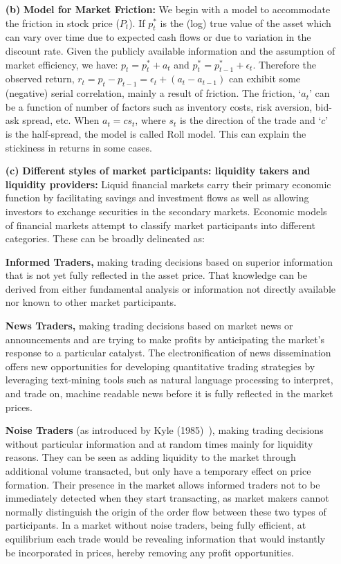 \begin{enumerate}
\item[\textbf{(b)}] {\bfseries Model for Market Friction:} We begin with a model to accommodate the friction in stock price ($P_t$). If $p_t^*$ is the (log) true value of the asset which can vary over time due to expected cash flows or due to variation in the discount rate. Given the publicly available information and the assumption of market efficiency, we have: $p_t= p_t^* + a_t$ and $p_t^*= p_{t-1}^* + \epsilon_t$. Therefore the observed return, $r_t= p_t - p_{t-1}= \epsilon_t + (a_t - a_{t-1})$ can exhibit some (negative) serial correlation, mainly a result of friction. The friction, `$a_t$' can be a function of number of factors such as inventory costs, risk aversion, bid-ask spread, etc. When $a_t= c s_t$, where $s_t$ is the direction of the trade and `$c$' is the half-spread, the model is called Roll model. This can explain the stickiness in returns in some cases.  

\item[\textbf{(c)}] {\bfseries Different styles of market participants: liquidity takers and liquidity providers:} Liquid financial markets carry their primary economic function by facilitating savings and investment flows as well as allowing investors to exchange securities in the secondary markets. Economic models of financial markets attempt to classify market participants into different categories. These can be broadly delineated as: \twomedskip

{\bfseries Informed Traders,} making trading decisions based on superior information that is not yet fully reflected in the asset price. That knowledge can be derived from either fundamental analysis or information not directly available nor known to other market participants. \twomedskip

{\bfseries News Traders,} making trading decisions based on market news or announcements and are trying to make profits by anticipating the market's response to a particular catalyst. The electronification of news dissemination offers new opportunities for developing quantitative trading strategies by leveraging text-mining tools such as natural language processing to interpret, and trade on, machine readable news before it is fully reflected in the market prices. %
 \twomedskip

{\bfseries Noise Traders} (as introduced by Kyle (1985)~\cite{kyle1985}), making trading decisions without particular information and at random times mainly for liquidity reasons. They can be seen as adding liquidity to the market through additional volume transacted, but only have a temporary effect on price formation. Their presence in the market allows informed traders not to be immediately detected when they start transacting, as market makers cannot normally distinguish the origin of the order flow between these two types of participants. In a market without noise traders, being fully efficient, at equilibrium each trade would be revealing information that would instantly be incorporated in prices, hereby removing any profit opportunities. \twomedskip


\end{enumerate}
